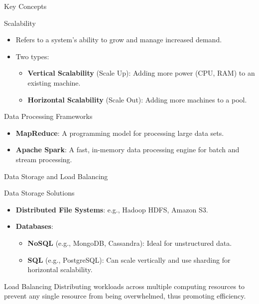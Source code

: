 \documentclass[aspectratio=169]{beamer}
\begin{document}
\begin{frame}{Key Concepts}
    \begin{block}{Scalability}
        \begin{itemize}
            \item Refers to a system's ability to grow and manage increased demand.
            \item Two types:
                \begin{itemize}
                    \item \textbf{Vertical Scalability} (Scale Up): Adding more power (CPU, RAM) to an existing machine.
                    \item \textbf{Horizontal Scalability} (Scale Out): Adding more machines to a pool.
                \end{itemize}
        \end{itemize}
    \end{block}
    
    \begin{block}{Data Processing Frameworks}
        \begin{itemize}
            \item \textbf{MapReduce}: A programming model for processing large data sets.
            \item \textbf{Apache Spark}: A fast, in-memory data processing engine for batch and stream processing.
        \end{itemize}
    \end{block}
\end{frame}

\begin{frame}{Data Storage and Load Balancing}
    \begin{block}{Data Storage Solutions}
        \begin{itemize}
            \item \textbf{Distributed File Systems}: e.g., Hadoop HDFS, Amazon S3.
            \item \textbf{Databases}:
                \begin{itemize}
                    \item \textbf{NoSQL} (e.g., MongoDB, Cassandra): Ideal for unstructured data.
                    \item \textbf{SQL} (e.g., PostgreSQL): Can scale vertically and use sharding for horizontal scalability.
                \end{itemize}
        \end{itemize}
    \end{block}

    \begin{block}{Load Balancing}
        Distributing workloads across multiple computing resources to prevent any single resource from being overwhelmed, thus promoting efficiency.
    \end{block}
\end{frame}
\end{document}
